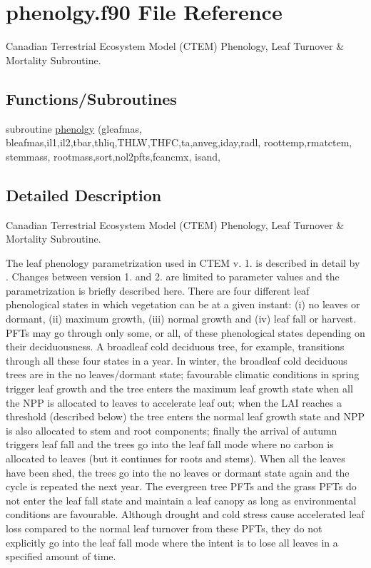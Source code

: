 \hypertarget{phenolgy_8f90}{}\section{phenolgy.\+f90 File Reference}
\label{phenolgy_8f90}


Canadian Terrestrial Ecosystem Model (C\+T\+E\+M) Phenology, Leaf Turnover \& Mortality Subroutine.  


\subsection*{Functions/\+Subroutines}
\begin{DoxyCompactItemize}
\item 
subroutine \hyperlink{phenolgy_8f90_a4b3d2519f936fde9752580d4c370329e}{phenolgy} (gleafmas, bleafmas,il1,il2,tbar,thliq,T\+H\+L\+W,T\+H\+F\+C,ta,anveg,iday,radl, roottemp,rmatctem, stemmass, rootmass,sort,nol2pfts,fcancmx, isand,
\end{DoxyCompactItemize}


\subsection{Detailed Description}
Canadian Terrestrial Ecosystem Model (C\+T\+E\+M) Phenology, Leaf Turnover \& Mortality Subroutine. 

The leaf phenology parametrization used in C\+T\+E\+M v. 1. is described in detail by \cite{Arora2005-6b1}. Changes between version 1. and 2. are limited to parameter values and the parametrization is briefly described here. There are four different leaf phenological states in which vegetation can be at a given instant\+: (i) no leaves or dormant, (ii) maximum growth, (iii) normal growth and (iv) leaf fall or harvest. P\+F\+Ts may go through only some, or all, of these phenological states depending on their deciduousness. A broadleaf cold deciduous tree, for example, transitions through all these four states in a year. In winter, the broadleaf cold deciduous trees are in the no leaves/dormant state; favourable climatic conditions in spring trigger leaf growth and the tree enters the maximum leaf growth state when all the N\+P\+P is allocated to leaves to accelerate leaf out; when the L\+A\+I reaches a threshold (described below) the tree enters the normal leaf growth state and N\+P\+P is also allocated to stem and root components; finally the arrival of autumn triggers leaf fall and the trees go into the leaf fall mode where no carbon is allocated to leaves (but it continues for roots and stems). When all the leaves have been shed, the trees go into the no leaves or dormant state again and the cycle is repeated the next year. The evergreen tree P\+F\+Ts and the grass P\+F\+Ts do not enter the leaf fall state and maintain a leaf canopy as long as environmental conditions are favourable. Although drought and cold stress cause accelerated leaf loss compared to the normal leaf turnover from these P\+F\+Ts, they do not explicitly go into the leaf fall mode where the intent is to lose all leaves in a specified amount of time.

